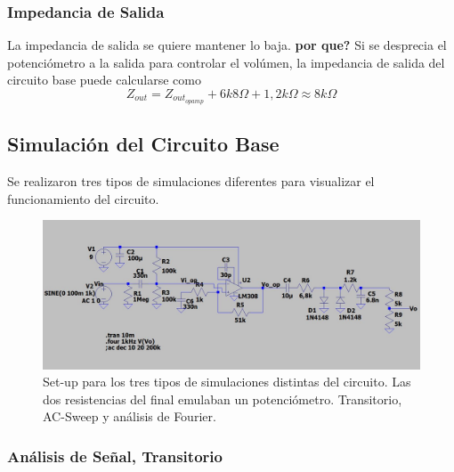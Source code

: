 \subsubsection{Impedancia de Salida}

La impedancia de salida se quiere mantener lo baja. \textbf{por que?}
Si se desprecia el potenciómetro a la salida para controlar el volúmen, la impedancia de salida del circuito base puede calcularse como
\[ Z_{out} = Z_{out_{opamp}} + 6k8\Omega + 1,2k\Omega \approx 8k\Omega \]

\subsection{Simulación del Circuito Base}

Se realizaron tres tipos de simulaciones diferentes para visualizar el funcionamiento del circuito.

\begin{figure}[H]
	\centering
	\includegraphics[width=1\textwidth, trim={0 0 0 0}, clip]{Ejercicio5/Imagenes/Circuito_base/Sim/sim_base.JPG}
	\caption{Set-up para los tres tipos de simulaciones distintas del circuito. Las dos resistencias del final emulaban un potenciómetro. Transitorio, AC-Sweep y análisis de Fourier.}
	\label{fig:sim_base}
\end{figure}

\subsubsection{Análisis de Señal, Transitorio}

